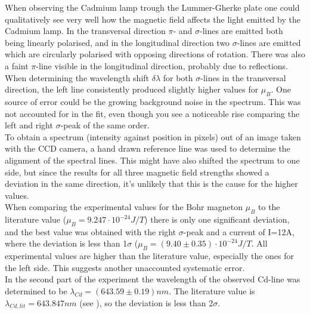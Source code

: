 \documentclass[12pt]{article}
\begin{document}
When observing the Cadmium lamp trough the Lummer-Gherke plate one could qualitatively see very well how the magnetic field affects the light emitted by the Cadmium lamp. In the transversal direction $\pi$- and $\sigma$-lines are emitted both being linearly polarised, and in the longitudinal direction two $\sigma$-lines are emitted which are circularly polarised with opposing directions of rotation. There was also a faint $\pi$-line visible in the longitudinal direction, probably due to reflections.
\\When determining the wavelength shift $\delta \lambda$ for both $\sigma$-lines in the transversal direction, the left line consistently produced slightly higher values for $\mu_B$. One source of error could be the growing background noise in the spectrum. This was not accounted for in the fit, even though you see a noticeable rise comparing the left and right $\sigma$-peak of the same order. 
\\To obtain a spectrum (intensity against position in pixels) out of an image taken with the CCD camera, a hand drawn reference line was used to determine the alignment of the spectral lines. This might have also shifted the spectrum to one side, but since the results for all three magnetic field strengths showed a deviation in the same direction, it's unlikely that this is the cause for the higher values. 
\\When comparing the experimental values for the Bohr magneton $\mu_B$ to the literature value ($\mu_B=9.247\cdot10^{-24}J/T$) there is only one significant deviation, and the best value was obtained with the right $\sigma$-peak and a current of I=12A, where the deviation is less than 1$\sigma$ ($\mu_B=(9.40\pm0.35)\cdot10^{-24}J/T$. All experimental values are higher than the literature value, especially the ones for the left side. This suggests another unaccounted systematic error.
\\In the second part of the experiment the wavelength of the observed Cd-line was determined to be $\lambda_{Cd}=(643.59\pm0.19)nm$. The literature value is $\lambda_{Cd, lit}=643.847nm$ (see \cite{nist}), so the deviation is less than 2$\sigma$. 
\end{document}

